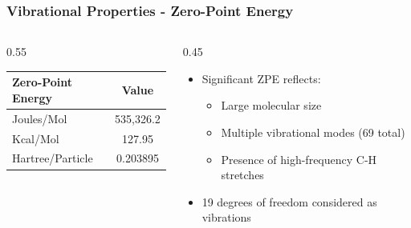 \documentclass[aspectratio=169, 9pt]{beamer}
\begin{document}
\begin{frame}
\frametitle{Vibrational Properties - Zero-Point Energy}
\begin{columns}
\begin{column}{0.55\textwidth}
\begin{center}
\begin{tabular}{|l|c|}
\hline
\textbf{Zero-Point Energy} & \textbf{Value} \\
\hline
Joules/Mol & 535,326.2 \\
\hline
Kcal/Mol & 127.95 \\
\hline
Hartree/Particle & 0.203895 \\
\hline
\end{tabular}
\end{center}
\end{column}
\begin{column}{0.45\textwidth}
\begin{itemize}
\item Significant ZPE reflects:
  \begin{itemize}
  \item Large molecular size
  \item Multiple vibrational modes (69 total)
  \item Presence of high-frequency C-H stretches
  \end{itemize}
\item 19 degrees of freedom considered as vibrations
\end{itemize}
\end{column}
\end{columns}
\end{frame}
\end{document}
